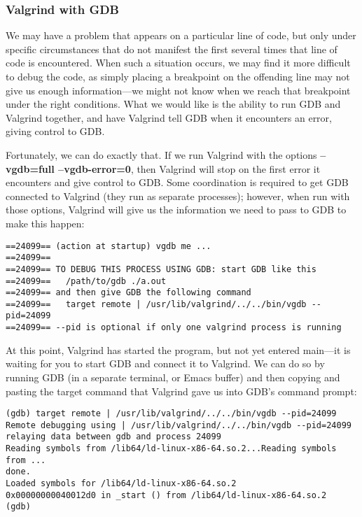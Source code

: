 \documentclass[11pt, a4paper]{article}
\begin{document}
\subsubsection{Valgrind with GDB}%
\label{ssub:valgrind_with_gdb}


We may have a problem that appears on a particular line of code, but only under specific circumstances that do not manifest the first several times that line of code is encountered. When such a situation occurs, we may find it more difficult to debug the code, as simply placing a breakpoint on the offending line may not give us enough information—we might not know when we reach that breakpoint under the right conditions. What we would like is the ability to run GDB and Valgrind together, and have Valgrind tell GDB when it encounters an error, giving control to GDB.

Fortunately, we can do exactly that. If we run Valgrind with the options \textbf{--vgdb=full --vgdb-error=0}, then Valgrind will stop on the first error it encounters and give control to GDB. Some coordination is required to get GDB connected to Valgrind (they run as separate processes); however, when run with those options, Valgrind will give us the information we need to pass to GDB to make this happen:



\begin{verbatim}
==24099== (action at startup) vgdb me ...
==24099==
==24099== TO DEBUG THIS PROCESS USING GDB: start GDB like this
==24099==   /path/to/gdb ./a.out
==24099== and then give GDB the following command
==24099==   target remote | /usr/lib/valgrind/../../bin/vgdb --pid=24099
==24099== --pid is optional if only one valgrind process is running 
\end{verbatim}


At this point, Valgrind has started the program, but not yet entered main—it is waiting for you to start GDB and connect it to Valgrind. We can do so by running GDB (in a separate terminal, or Emacs buffer) and then copying and pasting the target command that Valgrind gave us into GDB's command prompt:


\begin{verbatim}
(gdb) target remote | /usr/lib/valgrind/../../bin/vgdb --pid=24099
Remote debugging using | /usr/lib/valgrind/../../bin/vgdb --pid=24099
relaying data between gdb and process 24099
Reading symbols from /lib64/ld-linux-x86-64.so.2...Reading symbols from ...
done.
Loaded symbols for /lib64/ld-linux-x86-64.so.2
0x00000000040012d0 in _start () from /lib64/ld-linux-x86-64.so.2
(gdb)
\end{verbatim}
\end{document}

